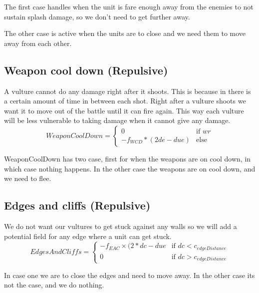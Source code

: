 	The first case handles when the unit is fare enough away from the enemies to not sustain splash damage, so we don't need to get further away.
	
	The other case is active when the units are to close and we need them to move away from each other.
	
	\subsection*{Weapon cool down (Repulsive)}
A vulture cannot do any damage right after it shoots. This is because in there is a certain amount of time in between each shot. Right after a vulture shoots we want it to move out of the battle until it can fire again. This way each vulture will be less vulnerable to taking damage when it cannot give any damage.
		\begin{displaymath}
			WeaponCoolDown = \begin{cases}
					0 & \text{if } wr\\
					-f_{WCD} * (2de - due) & \text{else}
				\end{cases}		
		\end{displaymath}

    WeaponCoolDown has two case, first for when the weapons are on cool down, in which case nothing happens. In the other case the weapons are on cool down, and we need to flee.        
    
	\subsection*{Edges and cliffs (Repulsive)}
		We do not want our vultures to get stuck against any walls so we will add a potential field for any edge where a unit can get stuck.
		\begin{displaymath}
			EdgesAndCliffs = \begin{cases}
					-f_{EAC} \times {(2*dc - due} & \text{if } dc < c_{edgeDistance}\\
					0 & \text{if } dc > c_{edgeDistance}
				\end{cases}		
		\end{displaymath}

    In case one we are to close the edges and need to move away. In the other case its not the case, and we do nothing.   

